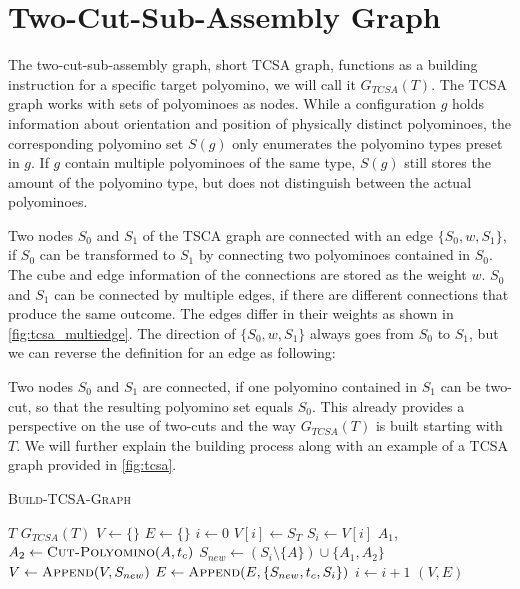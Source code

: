 \section{Two-Cut-Sub-Assembly Graph}
\label{sec:tcsa}

The two-cut-sub-assembly graph, short TCSA graph, functions as a building instruction for a specific target polyomino, we will call it $G_{TCSA}(T)$.
The TCSA graph works with sets of polyominoes as nodes.
While a configuration $g$ holds information about orientation and position of physically distinct polyominoes, the corresponding polyomino set $S(g)$ only enumerates the polyomino types preset in $g$.
If $g$ contain multiple polyominoes of the same type, $S(g)$ still stores the amount of the polyomino type, but does not distinguish between the actual polyominoes.

Two nodes $S_0$ and $S_1$ of the TSCA graph are connected with an edge $\{S_0,w,S_1\}$, if $S_0$ can be transformed to $S_1$ by connecting two polyominoes contained in $S_0$.
The cube and edge information of the connections are stored as the weight $w$.
$S_0$ and $S_1$ can be connected by multiple edges, if there are different connections that produce the same outcome.
The edges differ in their weights as shown in \autoref{fig:tcsa_multiedge}.
The direction of $\{S_0,w,S_1\}$ always goes from $S_0$ to $S_1$, but we can reverse the definition for an edge as following:

Two nodes $S_0$ and $S_1$ are connected, if one polyomino contained in $S_1$ can be two-cut, so that the resulting polyomino set equals $S_0$.
This already provides a perspective on the use of two-cuts and the way $G_{TCSA}(T)$ is built starting with $T$.
We will further explain the building process along with an example of a TCSA graph provided in \autoref{fig:tcsa}.


\begin{algorithm}
	\caption{\scshape Build-TCSA-Graph}
	\label{algo:build_tcsa}
	\begin{algorithmic}[1]
		\REQUIRE $T$
		\ENSURE $G_{TCSA}(T)$  
		\STATE $V \gets \{\}$
		\STATE $E \gets \{\}$
		\STATE $i \gets 0$
		\STATE $V[i] \gets S_T$
			\STATE $S_i \gets V[i]$
					\STATE $A_1$,$A_2 \gets \text{\scshape Cut-Polyomino}(A, t_c)$
					\STATE $S_{new} \gets \left( S_i \setminus \{A\} \right) \cup \{A_1, A_2\}$ 
						\STATE $V \gets \text{\scshape Append}(V, S_{new})$
					\ENDIF
					\STATE $E \gets \text{\scshape Append}(E, \{S_{new}, t_c, S_i\})$
				\ENDFOR
			\ENDFOR
			\STATE $i \gets i+1$
		\ENDWHILE
		\RETURN $(V,E)$
	\end{algorithmic}
\end{algorithm}


